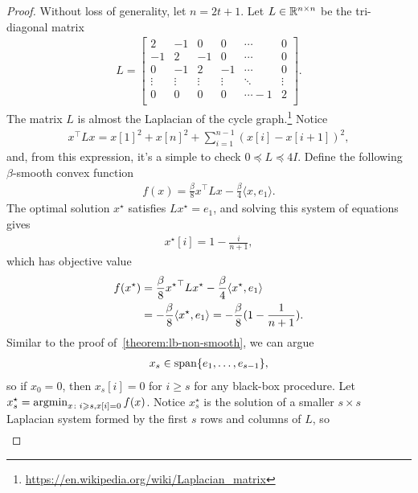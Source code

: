 \begin{proof}
Without loss of generality, let $n = 2t+1$.
Let $L \in \mathbb{R}^{n \times n}$ be the tri-diagonal matrix
\begin{align}
    L =
    \begin{bmatrix}
        2 & -1 & 0 & 0 & \cdots & 0 \\
        -1 & 2 & -1 & 0 & \cdots & 0 \\
        0 & -1 & 2 & -1  & \cdots & 0 \\
        \vdots & \vdots & \vdots & \vdots & \ddots & \vdots \\
        0 & 0 & 0 & 0 & \cdots -1 & 2  \\
    \end{bmatrix}.
\end{align}
The matrix $L$ is almost the Laplacian of the cycle
graph.\footnote{\url{https://en.wikipedia.org/wiki/Laplacian_matrix}}
Notice
\begin{align}
    x^\top L x = x[1]^2 + x[n]^2 + \sum_{i=1}^{n-1} (x[i] - x[i+1])^2,
\end{align}
and, from this expression, it's a simple to check
$0 \preceq L \preceq 4I$.
Define the following $\beta$-smooth convex function
\begin{align}
    f(x) = \frac{\beta}{8} x^\top L x - \frac{\beta}{4}\langle x, e_1 \rangle.
\end{align}
The optimal solution $x^\star$ satisfies $Lx^\star = e_1$, and solving this 
system of equations gives
\begin{align}
    x^\star[i] = 1 - \frac{i}{n+1},
\end{align}
which has objective value
\begin{align}
    f(x^\star)
    &=  \frac{\beta}{8} {x^\star}^\top L x^\star - \frac{\beta}{4}\langle
    x^\star, e_1 \rangle \\
    &= -\frac{\beta}{8} \langle x^\star, e_1 \rangle
    = -\frac{\beta}{8} (1 - \frac{1}{n+1} ).
\end{align}
Similar to the proof of~\eqref{theorem:lb-non-smooth}, we can argue
\begin{align}
    x_s \in \mathop{\rm span}\{e_1, \dots, e_{s-1}\},
\end{align}
so if $x_0 = 0$, then $x_s[i] = 0$ for $i \geq s$ for any black-box procedure.
Let $x_s^\star = \mathop{\rm argmin}_{x \colon i\geqslant s, x[i] = 0} f(x)$. Notice $x_s^\star$
is the solution of a smaller $s \times s$ Laplacian system formed by the
first $s$ rows and columns of $L$, so
\begin{align}

\end{align}
\end{proof}
